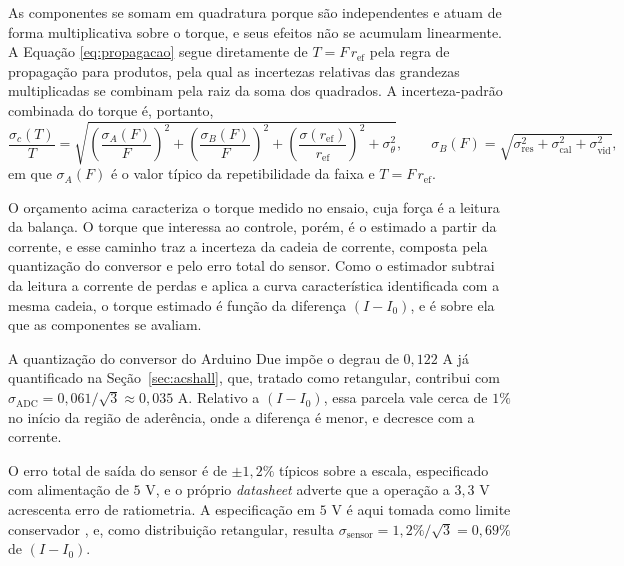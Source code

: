 As componentes se somam em quadratura porque são independentes e atuam de forma
multiplicativa sobre o torque, e seus efeitos não se acumulam linearmente. A
Equação \eqref{eq:propagacao} segue diretamente de $T = F\,r_\mathrm{ef}$ pela regra de
propagação para produtos, pela qual as incertezas relativas das grandezas multiplicadas se
combinam pela raiz da soma dos quadrados. A incerteza-padrão combinada do torque é,
portanto,
\begin{equation}\label{eq:propagacao}
\frac{\sigma_c(T)}{T} = \sqrt{\left(\frac{\sigma_A(F)}{F}\right)^2
                        + \left(\frac{\sigma_B(F)}{F}\right)^2
                        + \left(\frac{\sigma(r_\mathrm{ef})}{r_\mathrm{ef}}\right)^2
                        + \sigma_{\theta}^2},
\qquad
\sigma_B(F) = \sqrt{\sigma_{\mathrm{res}}^2 + \sigma_{\mathrm{cal}}^2 +
\sigma_{\mathrm{vid}}^2},
\end{equation}
em que $\sigma_A(F)$ é o valor típico da repetibilidade da faixa e $T = F\,r_\mathrm{ef}$.

O orçamento acima caracteriza o torque medido no ensaio, cuja força é a leitura da
balança. O torque que interessa ao controle, porém, é o estimado a partir da corrente, e
esse caminho traz a incerteza da cadeia de corrente, composta pela quantização do conversor
e pelo erro total do sensor. Como o estimador subtrai da leitura a corrente de perdas e
aplica a curva característica identificada com a mesma cadeia, o torque estimado é função
da diferença $(I - I_0)$, e é sobre ela que as componentes se avaliam.

A quantização do conversor do Arduino Due impõe o degrau de $0{,}122$ A já quantificado na
Seção~\ref{sec:acshall}, que, tratado como retangular, contribui com
$\sigma_{\mathrm{ADC}} = 0{,}061/\sqrt{3} \approx 0{,}035$ A. Relativo a $(I - I_0)$, essa
parcela vale cerca de $1\%$ no início da região de aderência, onde a diferença é menor, e
decresce com a corrente.

O erro total de saída do sensor é de $\pm 1{,}2\%$ típicos sobre a escala, especificado com
alimentação de $5$ V, e o próprio \emph{datasheet} adverte que a operação a $3{,}3$ V
acrescenta erro de ratiometria. A especificação em $5$ V é aqui tomada como limite
conservador \cite{acs758_datasheet}, e, como distribuição retangular, resulta
$\sigma_{\mathrm{sensor}} = 1{,}2\%/\sqrt{3} = 0{,}69\%$ de $(I - I_0)$.

